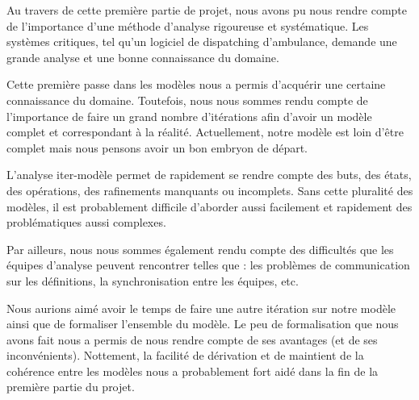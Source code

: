 Au travers de cette première partie de projet, nous avons pu nous rendre
compte de l'importance d'une méthode d'analyse rigoureuse et systématique.
Les systèmes critiques, tel qu'un logiciel de dispatching d'ambulance, demande
une grande analyse et une bonne connaissance du domaine. 

Cette première passe dans les modèles nous a permis d'acquérir une certaine
connaissance du domaine. Toutefois, nous nous sommes rendu compte de 
l'importance de faire un grand nombre d'itérations afin d'avoir un modèle 
complet et correspondant à la réalité. Actuellement, notre modèle est loin
d'être complet mais nous pensons avoir un bon embryon de départ.

L'analyse iter-modèle permet de rapidement se rendre compte des buts, des
états, des opérations, des rafinements manquants ou incomplets. Sans cette 
pluralité des modèles, il est probablement difficile d'aborder aussi facilement
et rapidement des problématiques aussi complexes.

Par ailleurs, nous nous sommes également rendu compte des difficultés que les
équipes d'analyse peuvent rencontrer telles que : les problèmes de communication
sur les définitions, la synchronisation entre les équipes, etc.

Nous aurions aimé avoir le temps de faire une autre itération sur notre modèle
ainsi que de formaliser l'ensemble du modèle. Le peu de formalisation que nous
avons fait nous a permis de nous rendre compte de ses avantages (et de ses
inconvénients). Nottement, la facilité de dérivation et de maintient de la
cohérence entre les modèles nous a probablement fort aidé dans la fin de la
première partie du projet.
